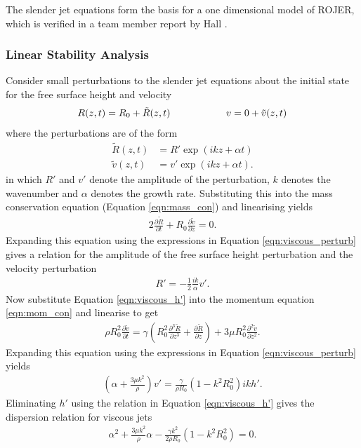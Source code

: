 \documentclass[11pt]{article}
\newcommand{\pd}[2]{\frac{\partial #1}{\partial #2}}
\newcommand{\pdtwo}[2]{\frac{\partial ^2 #1}{\partial #2 ^2}}
\newcommand{\pdthree}[2]{\frac{\partial ^3 #1}{\partial #2 ^3}}
\begin{document}
The slender jet equations form the basis for a one dimensional model of ROJER, which is verified in a team member report by Hall \cite{hall2015report}.

\subsubsection{Linear Stability Analysis}
Consider small perturbations to the slender jet equations about the initial state for the free surface height and velocity
\begin{align*}
R(z,t) = R_0+ \tilde{R}(z,t) \hspace*{2cm} v = 0 + \tilde{v}(z,t)
\end{align*}
where the perturbations are of the form
\begin{align}
\tilde{R}(z,t) &= R' \exp(ikz + \alpha t) \nonumber \\
\tilde{v}(z,t) &= v' \exp(ikz + \alpha t).
\label{eqn:viscous_perturb}
\end{align}
in which $R'$ and $v'$ denote the amplitude of the perturbation, $k$ denotes the wavenumber and $\alpha$ denotes the growth rate. Substituting this into the mass conservation equation (Equation \ref{eqn:mass_con}) and linearising yields 
\begin{align}
2 \pd{\tilde{R}}{t} + R_0 \pd{\tilde{v}}{z} = 0.
\end{align}
Expanding this equation using the expressions in Equation \ref{eqn:viscous_perturb} gives a relation for the amplitude of the free surface height perturbation and the velocity perturbation
\begin{align}
R' = -\frac{1}{2} \frac{ik}{\alpha} v'.
\label{eqn:viscous_h'}
\end{align}
Now substitute Equation \ref{eqn:viscous_h'} into the momentum equation \ref{eqn:mom_con} and linearise to get
\begin{align*}
\rho R_0^2 \pd{\tilde{v}}{t} = \gamma \left( R_0^2 \pdthree{\tilde{R}}{z} + \pd{\tilde{R}}{z} \right) + 3 \mu R_0^2 \pdtwo{\tilde{v}}{z}.
\end{align*}
Expanding this equation using the expressions in Equation \ref{eqn:viscous_perturb} yields
\begin{align*}
\left(\alpha + \frac{3 \mu k^2}{\rho} \right) v' = \frac{\gamma}{\rho R_0}(1 - k^2 R_0^2) i k h'.
\end{align*}
Eliminating $h'$ using the relation in Equation \ref{eqn:viscous_h'} gives the dispersion relation for viscous jets
\begin{align}
\alpha^2 + \frac{3 \mu k^2}{\rho}\alpha - \frac{\gamma k^2}{2 \rho R_0}(1 - k^2R_0^2) = 0.
\label{eqn:dispersion_viscous}
\end{align}
\end{document}
